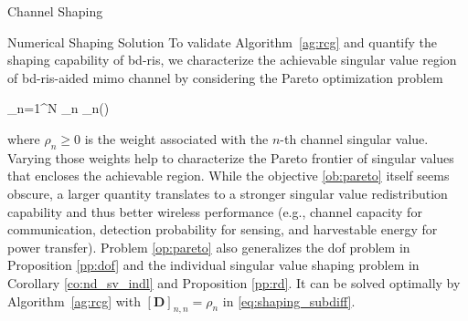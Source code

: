 \documentclass[journal]{IEEEtran}
\begin{document}
\begin{section}{Channel Shaping}
\begin{subsection}{Numerical Shaping Solution}
		To validate Algorithm~\ref{ag:rcg} and quantify the shaping capability of \gls{bd}-\gls{ris}, we characterize the achievable singular value region of \gls{bd}-\gls{ris}-aided \gls{mimo} channel by considering the Pareto optimization problem
		\begin{maxi!}
			{\scriptstyle{\mathbf{\Theta}}}{\sum_{n=1}^N \rho_n \sigma_n()}{\label{op:pareto}}{\label{ob:pareto}}
		\end{maxi!}
		where $\rho_n \ge 0$ is the weight associated with the $n$-th channel singular value.
		Varying those weights help to characterize the Pareto frontier of singular values that encloses the achievable region.
		While the objective \eqref{ob:pareto} itself seems obscure, a larger quantity translates to a stronger singular value redistribution capability and thus better wireless performance (e.g., channel capacity for communication, detection probability for sensing, and harvestable energy for power transfer).
		Problem \eqref{op:pareto} also generalizes the \gls{dof} problem in Proposition \ref{pp:dof} and the individual singular value shaping problem in Corollary \ref{co:nd_sv_indl} and Proposition \ref{pp:rd}.
		It can be solved optimally by Algorithm~\ref{ag:rcg} with $[\mathbf{D}]_{n,n} = \rho_n$ in \eqref{eq:shaping_subdiff}.
	\end{subsection}
\end{section}
\end{document}
